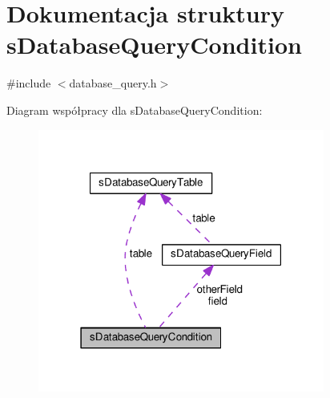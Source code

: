 \hypertarget{structsDatabaseQueryCondition}{}\section{Dokumentacja struktury s\+Database\+Query\+Condition}
\label{structsDatabaseQueryCondition}


{\ttfamily \#include $<$database\+\_\+query.\+h$>$}



Diagram współpracy dla s\+Database\+Query\+Condition\+:\nopagebreak
\begin{figure}[H]
\begin{center}
\leavevmode
\includegraphics[width=267pt]{structsDatabaseQueryCondition__coll__graph}
\end{center}
\end{figure}
